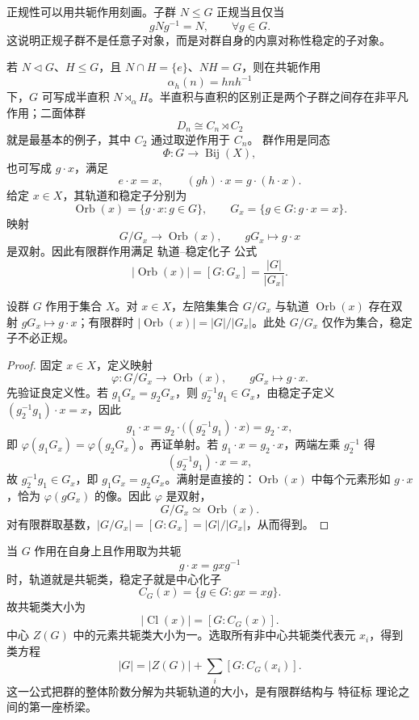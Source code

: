 正规性可以用共轭作用刻画。子群 $N\le G$ 正规当且仅当
\[
gNg^{-1}=N,
\qquad \forall g\in G.
\]
这说明正规子群不是任意子对象，而是对群自身的内禀对称性稳定的子对象。

若 $N\triangleleft G$、$H\le G$，且 $N\cap H=\{e\}$、$NH=G$，则在共轭作用
\[
\alpha_h(n)=hnh^{-1}
\]
下，$G$ 可写成半直积 $N\rtimes_\alpha H$。半直积与直积的区别正是两个子群之间存在非平凡作用；二面体群
\[
D_n\cong C_n\rtimes C_2
\]
就是最基本的例子，其中 $C_2$ 通过取逆作用于 $C_n$。
群作用是同态
\[
\Phi:G\longrightarrow \operatorname{Bij}(X),
\]
也可写成 $g\cdot x$，满足
\[
e\cdot x=x,
\qquad
(gh)\cdot x=g\cdot(h\cdot x).
\]
给定 $x\in X$，其轨道和稳定子分别为
\[
\operatorname{Orb}(x)=\{g\cdot x:g\in G\},
\qquad
G_x=\{g\in G:g\cdot x=x\}.
\]
映射
\[
G/G_x\longrightarrow \operatorname{Orb}(x),
\qquad
gG_x\longmapsto g\cdot x
\]
是双射。因此有限群作用满足 轨道--稳定化子 公式
\begin{equation}
|\operatorname{Orb}(x)|=[G:G_x]
=\frac{|G|}{|G_x|}.
\label{eq:orbit-stabilizer}
\end{equation}

\begin{proposition}[轨道与稳定子的陪集对应]
设群 $G$ 作用于集合 $X$。对 $x\in X$，左陪集集合 $G/G_x$ 与轨道 $\operatorname{Orb}(x)$ 存在双射 $gG_x\mapsto g\cdot x$；有限群时 $|\operatorname{Orb}(x)|=|G|/|G_x|$。此处 $G/G_x$ 仅作为集合，稳定子不必正规。
\end{proposition}
\begin{proof}
固定 $x\in X$，定义映射
\[
\varphi:G/G_x\longrightarrow\operatorname{Orb}(x),
\qquad
gG_x\longmapsto g\cdot x.
\]
先验证良定义性。若 $g_1G_x=g_2G_x$，则 $g_2^{-1}g_1\in G_x$，由稳定子定义 $(g_2^{-1}g_1)\cdot x=x$，因此
\[
g_1\cdot x
=g_2\cdot\bigl((g_2^{-1}g_1)\cdot x\bigr)
=g_2\cdot x,
\]
即 $\varphi(g_1G_x)=\varphi(g_2G_x)$。再证单射。若 $g_1\cdot x=g_2\cdot x$，两端左乘 $g_2^{-1}$ 得
\[
(g_2^{-1}g_1)\cdot x=x,
\]
故 $g_2^{-1}g_1\in G_x$，即 $g_1G_x=g_2G_x$。满射是直接的：$\operatorname{Orb}(x)$ 中每个元素形如 $g\cdot x$，恰为 $\varphi(gG_x)$ 的像。因此 $\varphi$ 是双射，
\[
G/G_x\simeq \operatorname{Orb}(x).
\]
对有限群取基数，$|G/G_x|=[G:G_x]=|G|/|G_x|$，从而得到。
\end{proof}


当 $G$ 作用在自身上且作用取为共轭
\[
g\cdot x=gxg^{-1}
\]
时，轨道就是共轭类，稳定子就是中心化子
\[
C_G(x)=\{g\in G:gx=xg\}.
\]
故共轭类大小为
\[
|\operatorname{Cl}(x)|=[G:C_G(x)].
\]
中心 $Z(G)$ 中的元素共轭类大小为一。选取所有非中心共轭类代表元 $x_i$，得到 类方程
\begin{equation}
|G|=|Z(G)|+\sum_i [G:C_G(x_i)].
\label{eq:class-equation}
\end{equation}
这一公式把群的整体阶数分解为共轭轨道的大小，是有限群结构与 特征标 理论之间的第一座桥梁。

